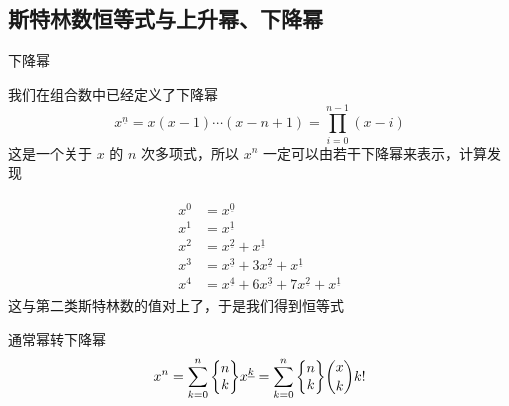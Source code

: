 \documentclass[UTF8]{beamer}
\begin{document}
    \subsection{斯特林数恒等式与上升幂、下降幂}
    \begin{frame}{下降幂}
        \small{
        我们在组合数中已经定义了下降幂
        \vspace{-0.5em}
        $$
        x^{\underline n} = x(x-1)\cdots(x-n+1) = \prod_{i=0}^{n-1}(x-i)
        $$
        \vspace{-0.8em}
        这是一个关于 $x$ 的 $n$ 次多项式，所以 $x^n$ 一定可以由若干下降幂来表示，计算发现

        \begin{gather*}
        \begin{aligned}
            x^0 &= x^{\underline 0}\\
            x^1 &= x^{\underline 1}\\
            x^2 &= x^{\underline 2}+x^{\underline 1}\\
            x^3 &= x^{\underline 3}+ 3x^{\underline 2} +x^{\underline 1}\\
            x^4 &= x^{\underline 4} + 6x^{\underline 3}+ 7x^{\underline 2} +x^{\underline 1}
        \end{aligned}
        \end{gather*}
        \pause
        这与第二类斯特林数的值对上了，于是我们得到恒等式
        \begin{block}{通常幂转下降幂}
            \vspace{-1em}
            $$
            x^n = \sum_{k=0}^n \St{n}k x^{\underline k} = \sum_{k=0}^n \St nk \binom xk k!
            $$
        \vspace{-1em}
        \end{block}
        }
    \end{frame}
\end{document}
